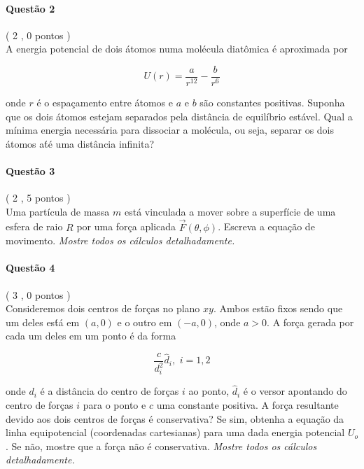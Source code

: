 \documentclass[12pt,a4paper]{article}
\begin{document}
\paragraph{Quest\~ao 2}( 2 , 0 pontos )\\
\indent A energia potencial de dois  \'atomos numa mol\'ecula diat\^omica  \'e aproximada por

\begin{displaymath}
    U(r)=\frac{a}{r^{12}}-\frac{b}{r^6}
\end{displaymath}

\noindent onde $r$ \'e o espa\c{c}amento entre \'atomos e $a$ e $b$ s\~ao constantes positivas. Suponha que os dois \'atomos estejam separados pela dist\^ancia de equil\'ibrio est\'avel. Qual a m\'inima energia necess\'aria para dissociar a mol\'ecula, ou seja, separar os dois  \'atomos at́\'e uma dist\^ancia infinita?

\paragraph{Quest\~ao 3}( 2 , 5 pontos )\\
\indent Uma part\'icula de massa $m$ est\'a vinculada a mover sobre a superf\'icie de uma esfera de raio $R$ por uma for\c{c}a aplicada $\vec F(\theta, \phi)$. Escreva a equa\c{c}\~ao de movimento. \textit{Mostre todos os c\'alculos detalhadamente.}\\

\newpage

\paragraph{Quest\~ao 4}( 3 , 0 pontos )\\
\indent Consideremos dois centros de for\c{c}as no plano $xy$. Ambos est\~ao fixos sendo que um deles
est́\'a em $(a, 0)$ e o outro em $(-a, 0)$, onde $a > 0$. A for\c{c}a gerada por cada um deles em um ponto \'e da forma

\begin{displaymath}
    \frac{c}{d_i^2}\hat{d}_i,\,\,i=1,2
\end{displaymath}

\noindent onde $d_i$ \'e a dist\^ancia do centro de for\c{c}as $i$ ao ponto, $\hat{d}_i$ \'e o versor apontando do centro de for\c{c}as $i$ para o ponto e $c$ uma constante positiva. A for\c{c}a resultante devido aos dois centros de for\c{c}as \'e conservativa? Se sim, obtenha a equa\c{c}\~ao da linha equipotencial (coordenadas cartesianas) para uma dada energia potencial $U_o$. Se n\~ao, mostre que a for\c{c}a n\~ao \'e conservativa. \textit{Mostre todos os c\'alculos detalhadamente.}
\end{document}
